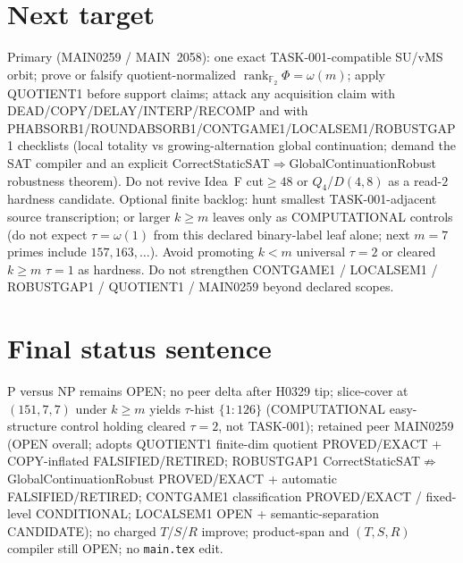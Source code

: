 \documentclass[11pt]{article}
\begin{document}
\section*{Next target}
Primary (MAIN0259 / MAIN~2058): one exact TASK-001-compatible SU/vMS orbit; prove or falsify
quotient-normalized $\operatorname{rank}_{\mathbb F_2}\Phi=\omega(m)$; apply QUOTIENT1 before support claims;
attack any acquisition claim with
DEAD/COPY/DELAY/INTERP/RECOMP and with PHABSORB1/ROUNDABSORB1/CONTGAME1/LOCALSEM1/ROBUSTGAP1 checklists
(local totality vs growing-alternation global continuation; demand the SAT compiler and an
explicit CorrectStaticSAT$\Rightarrow$GlobalContinuationRobust robustness theorem).
Do not revive Idea~F cut$\ge48$ or $Q_4$/$D(4,8)$ as a read-$2$ hardness candidate.
Optional finite backlog: hunt smallest TASK-001-adjacent source transcription;
or larger $k{\ge}m$ leaves only as COMPUTATIONAL controls (do not expect $\tau=\omega(1)$
from this declared binary-label leaf alone; next $m{=}7$ primes include $157,163,\ldots$).
Avoid promoting $k{<}m$ universal $\tau{=}2$ or cleared $k{\ge}m$ $\tau{=}1$ as hardness.
Do not strengthen CONTGAME1 / LOCALSEM1 / ROBUSTGAP1 / QUOTIENT1 / MAIN0259 beyond declared scopes.

\section*{Final status sentence}
P versus NP remains OPEN; no peer delta after H0329 tip; slice-cover at $(151,7,7)$ under $k{\ge}m$ yields $\tau$-hist $\{1{:}126\}$ (COMPUTATIONAL easy-structure control holding cleared $\tau{=}2$, not TASK-001); retained peer MAIN0259 (OPEN overall; adopts QUOTIENT1 finite-dim quotient PROVED/EXACT + COPY-inflated FALSIFIED/RETIRED; ROBUSTGAP1 CorrectStaticSAT$\not\Rightarrow$GlobalContinuationRobust PROVED/EXACT + automatic FALSIFIED/RETIRED; CONTGAME1 classification PROVED/EXACT / fixed-level CONDITIONAL; LOCALSEM1 OPEN + semantic-separation CANDIDATE); no charged $T$/$S$/$R$ improve; product-span and $(T,S,R)$ compiler still OPEN; no \texttt{main.tex} edit.
\end{document}
